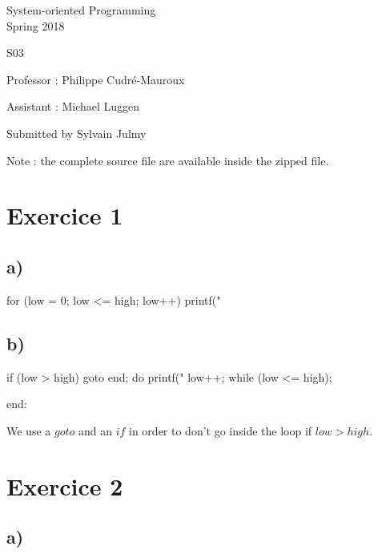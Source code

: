 \documentclass[a4paper,11pt]{report}
\author{Sylvain Julmy}
\date{\today}
\begin{document}
\begin{center}
  \Large{
    System-oriented Programming\\
    Spring 2018
  }
  
  \noindent\makebox[\linewidth]{\rule{\linewidth}{0.4pt}}
  S03
  \noindent\makebox[\linewidth]{\rule{\linewidth}{0.4pt}}

  \begin{flushleft}
    Professor : Philippe Cudré-Mauroux

    Assistant : Michael Luggen
  \end{flushleft}
  
  \noindent\makebox[\linewidth]{\rule{\linewidth}{0.4pt}}

  Submitted by Sylvain Julmy
  
  \noindent\makebox[\linewidth]{\rule{\textwidth}{1pt}}
\end{center}

Note : the complete source file are available inside the zipped file.

\section*{Exercice 1}

\subsection*{a)}

\begin{ccode}
for (low = 0; low <= high; low++)
        printf("%
\end{ccode}

\subsection*{b)}

\begin{ccode}
if (low > high) goto end;
do
{
    printf("%
    low++;
} while (low <= high);

end:
\end{ccode}

We use a $goto$ and an $if$ in order to don't go inside the loop if $low > high$.

\section*{Exercice 2}

\subsection*{a)}
\end{document}
